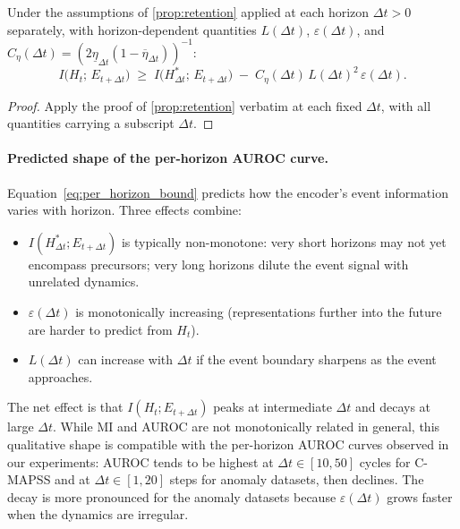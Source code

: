 \begin{proposition}
\label{prop:per_horizon}
Under the assumptions of \cref{prop:retention} applied at each horizon $\Delta t > 0$ separately, with horizon-dependent quantities $L(\Delta t)$, $\varepsilon(\Delta t)$, and $C_\eta(\Delta t) = (2\underline{\eta}_{\Delta t}(1-\overline{\eta}_{\Delta t}))^{-1}$:
\begin{equation}
\label{eq:per_horizon_bound}
I\bigl(H_t;\, E_{t+\Delta t}\bigr)
\;\geq\;
I\bigl(H^*_{\Delta t};\, E_{t+\Delta t}\bigr)
\;-\;
C_\eta(\Delta t)\,L(\Delta t)^2\,\varepsilon(\Delta t).
\end{equation}
\end{proposition}

\begin{proof}
Apply the proof of \cref{prop:retention} verbatim at each fixed $\Delta t$, with all quantities carrying a subscript $\Delta t$.
\end{proof}

\paragraph{Predicted shape of the per-horizon AUROC curve.}
Equation~\eqref{eq:per_horizon_bound} predicts how the encoder's event information varies with horizon. Three effects combine:
\begin{itemize}[nosep]
  \item $I(H^*_{\Delta t}; E_{t+\Delta t})$ is typically non-monotone: very short horizons may not yet encompass precursors; very long horizons dilute the event signal with unrelated dynamics.
  \item $\varepsilon(\Delta t)$ is monotonically increasing (representations further into the future are harder to predict from $H_t$).
  \item $L(\Delta t)$ can increase with $\Delta t$ if the event boundary sharpens as the event approaches.
\end{itemize}
The net effect is that $I(H_t; E_{t+\Delta t})$ peaks at intermediate $\Delta t$ and decays at large $\Delta t$. While MI and AUROC are not monotonically related in general, this qualitative shape is compatible with the per-horizon AUROC curves observed in our experiments: AUROC tends to be highest at $\Delta t \in [10, 50]$ cycles for C-MAPSS and at $\Delta t \in [1, 20]$ steps for anomaly datasets, then declines. The decay is more pronounced for the anomaly datasets because $\varepsilon(\Delta t)$ grows faster when the dynamics are irregular.

